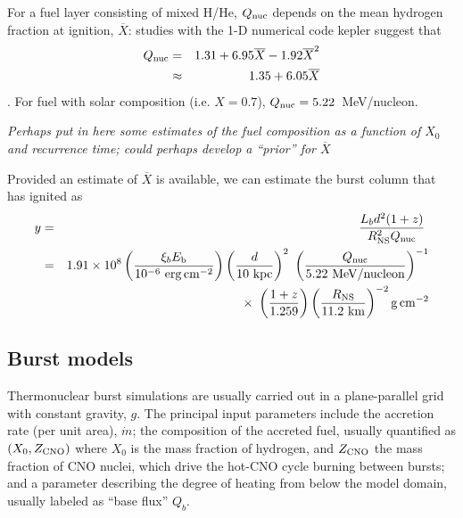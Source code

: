 \documentclass{aastex63}
\newcommand{\epc}{{\rm erg\,cm^{-2}}}
\newcommand{\Xb}{\ensuremath{\overline{X}}}
\newcommand{\qnuc}{Q_{\rm nuc}}
\newcommand{\opz}{1.259}
\begin{document}
For a fuel layer consisting of mixed H/He, $\qnuc$ depends on the mean hydrogen fraction at ignition, \Xb:
studies with the 1-D numerical code {\sc kepler} suggest that 
\begin{eqnarray}
Q_{\rm nuc} &= & 1.31+6.95\Xb-1.92\Xb^2 \nonumber \\
& \approx & 1.35 + 6.05 \Xb
\label{eq:qnuc}
\end{eqnarray}
\cite[]{goodwin19a}.
For fuel with solar composition (i.e. $X=0.7$), $Q_{\rm nuc}=5.22$~MeV/nucleon.

{\it Perhaps put in here some estimates of the fuel composition as a function of $X_0$ and recurrence time; could perhaps develop a ``prior'' for $\Xb$ }

Provided an estimate of $\Xb$ is available, we can estimate the burst column that has ignited as
\begin{eqnarray}
y & = & \frac{L_b d^2 (1+z)}{R_{\rm NS}^2 Q_{\rm nuc}}\ 
                                                            \nonumber \\
  & = & 1.91\times10^8 \left(\frac{\xi_b E_{\rm b}}{10^{-6}\ \epc}\right)
                      \left(\frac{d}{10\ {\rm kpc}}\right)^2\
             \left(\frac{Q_{\rm nuc}}{5.22\ {\rm MeV/nucleon}}\right)^{-1}
\nonumber \\ & & \times\  %
                      \left(\frac{1+z}{\opz}\right)
                      \left(\frac{R_{\rm NS}}{11.2\ {\rm km}}\right)^{-2}
                      {\rm g\,cm^{-2}}
\label{eq:column}
\end{eqnarray}

\subsection{Burst models}
\label{subsec:models}

Thermonuclear burst simulations \cite[e.g. with {\sc kepler};][]{woos04} are usually carried out in a plane-parallel grid with constant gravity, $g$. The principal input parameters include the accretion rate (per unit area), $\dot{m}$; the composition of the accreted fuel, usually quantified as $(X_0, Z_{\rm CNO})$ where $X_0$ is the mass fraction of hydrogen, and $Z_{\rm CNO}$ the mass fraction of CNO nuclei, which drive the hot-CNO cycle burning between bursts; and a parameter describing the degree of heating from below the model domain, usually labeled as ``base flux'' $Q_b$.
\end{document}
